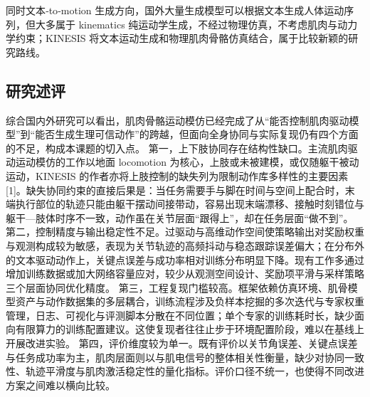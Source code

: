 同时文本‑to‑motion 生成方向，国外大量生成模型可以根据文本生成人体运动序列，但大多属于 kinematics 纯运动学生成，不经过物理仿真，不考虑肌肉与动力学约束；KINESIS 将文本运动生成和物理肌肉骨骼仿真结合，属于比较新颖的研究路线。
\subsection{研究述评}
综合国内外研究可以看出，肌肉骨骼运动模仿已经完成了从“能否控制肌肉驱动模型”到“能否生成生理可信动作”的跨越，但面向全身协同与实际复现仍有四个方面的不足，构成本课题的切入点。
第一，上下肢协同存在结构性缺口。主流肌肉驱动运动模仿的工作以地面 locomotion 为核心，上肢或未被建模，或仅随躯干被动运动，KINESIS 的作者亦将上肢控制的缺失列为限制动作库多样性的主要因素[1]。缺失协同约束的直接后果是：当任务需要手与脚在时间与空间上配合时，末端执行部位的轨迹只能由躯干摆动间接带动，容易出现末端漂移、接触时刻错位与躯干—肢体时序不一致，动作虽在关节层面“跟得上”，却在任务层面“做不到”。
第二，控制精度与输出稳定性不足。过驱动与高维动作空间使策略输出对奖励权重与观测构成较为敏感，表现为关节轨迹的高频抖动与稳态跟踪误差偏大；在分布外的文本驱动动作上，关键点误差与成功率相对训练分布明显下降。现有工作多通过增加训练数据或加大网络容量应对，较少从观测空间设计、奖励项平滑与采样策略三个层面协同优化精度。
第三，工程复现门槛较高。框架依赖仿真环境、肌骨模型资产与动作数据集的多层耦合，训练流程涉及负样本挖掘的多次迭代与专家权重管理，日志、可视化与评测脚本分散在不同位置；单个专家的训练耗时长，缺少面向有限算力的训练配置建议。这使复现者往往止步于环境配置阶段，难以在基线上开展改进实验。
第四，评价维度较为单一。既有评价以关节角误差、关键点误差与任务成功率为主，肌肉层面则以与肌电信号的整体相关性衡量，缺少对协同一致性、轨迹平滑度与肌肉激活稳定性的量化指标。评价口径不统一，也使得不同改进方案之间难以横向比较。

